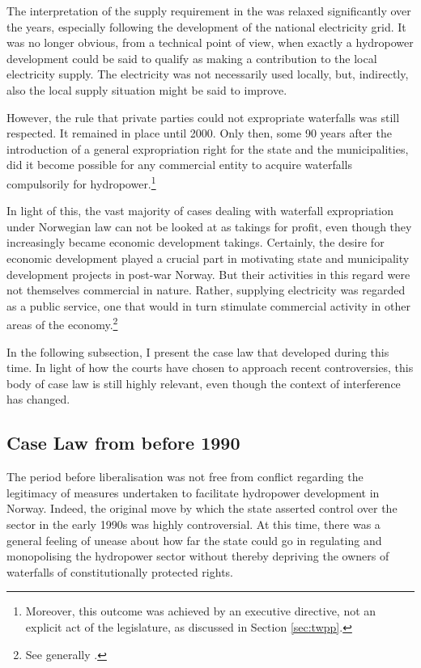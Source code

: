 The interpretation of the supply requirement in the \cite{wra40} was relaxed significantly over the years, especially following the development of the national electricity grid. It was no longer obvious, from a technical point of view, when exactly a hydropower development could be said to qualify as making a contribution to the local electricity supply. The electricity was not necessarily used locally, but, indirectly, also the local supply situation might be said to improve.

However, the rule that private parties could not expropriate waterfalls was still respected. It remained in place until 2000. Only then, some 90 years after the introduction of a general expropriation right for the state and the municipalities, did it become possible for any commercial entity to acquire waterfalls compulsorily for hydropower.\footnote{Moreover, this outcome was achieved by an executive directive, not an explicit act of the legislature, as discussed in Section \ref{sec:twpp}.}

In light of this, the vast majority of cases dealing with waterfall expropriation under Norwegian law can not be looked at as takings for profit, even though they increasingly became economic development takings. Certainly, the desire for economic development played a crucial part in motivating state and municipality development projects in post-war Norway. But their activities in this regard were not themselves commercial in nature. Rather, supplying electricity was regarded as a public service, one that would in turn stimulate commercial activity in other areas of the economy.\footnote{See generally \cite{thue06b,skjold06}.}

In the following subsection, I present the case law that developed during this time. In light of how the courts have chosen to approach recent controversies, this body of case law is still highly relevant, even though the context of interference has changed.

\subsection{Case Law from before 1990}\label{sec:prelib}

The period before liberalisation was not free from conflict regarding the legitimacy of measures undertaken to facilitate hydropower development in Norway. Indeed, the original move by which the state asserted control over the sector in the early 1990s was highly controversial. At this time, there was a general feeling of unease about how far the state could go in regulating and monopolising the hydropower sector without thereby depriving the owners of waterfalls of constitutionally protected rights.

